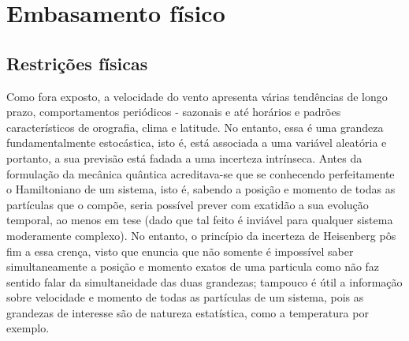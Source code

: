 \documentclass[
	12pt,				%
	openright,			%
	oneside,			%
	a4paper,			%
	english,			%
	french,				%
	spanish,			%
	brazil				%
	]{abntex2}
\begin{document}


\chapter{Embasamento físico}


\section{Restrições físicas}
Como fora exposto, a velocidade do vento apresenta várias tendências de longo prazo, comportamentos periódicos - sazonais e até horários e padrões característicos de orografia, clima e latitude. No entanto, essa é uma grandeza fundamentalmente estocástica, isto é, está associada a uma variável aleatória e portanto, a sua previsão está fadada a uma incerteza intrínseca. Antes da formulação da mecânica quântica acreditava-se que se conhecendo perfeitamente o Hamiltoniano de um sistema, isto é, sabendo a posição e momento de todas as partículas que o compõe, seria possível prever com exatidão a sua evolução temporal, ao menos em tese (dado que tal feito é inviável para qualquer sistema moderamente complexo). No entanto, o princípio da incerteza de Heisenberg pôs fim a essa crença, visto que enuncia que não somente é impossível saber simultaneamente a posição e momento exatos de uma particula como não faz sentido falar da simultaneidade das duas grandezas; tampouco é útil a informação sobre velocidade e momento de todas as partículas de um sistema, pois as grandezas de interesse são de natureza estatística, como a temperatura por exemplo. 
\end{document}
